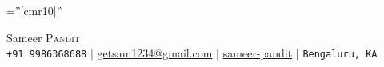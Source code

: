 \documentclass[a4paper,10pt]{article}
\begin{document}

\pagestyle{empty} %

\font\fb=''[cmr10]'' %

\begin{center}
    {\Huge Sameer \textsc{Pandit}} \\ \vspace{5pt}
    \small \faPhone* \texttt{+91 9986368688} \hspace{1pt} $|$
    \hspace{1pt} \faEnvelope \hspace{2pt} \href{mailto:getsam1234@gmail.com}{getsam1234@gmail.com} \hspace{1pt} $|$ 
    \hspace{1pt} \faLinkedin \hspace{2pt} \href{www.linkedin.com/in/sameer-pandit-60007919}{sameer-pandit} \hspace{1pt} $|$
    \hspace{1pt} \faMapMarker* \hspace{2pt}\texttt{Bengaluru, KA}
    \\ \vspace{-3pt}
\end{center}

%

%

\hfill \break
\end{document}
